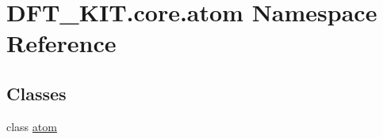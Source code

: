 \hypertarget{namespace_d_f_t___k_i_t_1_1core_1_1atom}{\section{D\+F\+T\+\_\+\+K\+I\+T.\+core.\+atom Namespace Reference}
\label{namespace_d_f_t___k_i_t_1_1core_1_1atom}
}
\subsection*{Classes}
\begin{DoxyCompactItemize}
\item 
class \hyperlink{class_d_f_t___k_i_t_1_1core_1_1atom_1_1atom}{atom}
\end{DoxyCompactItemize}
